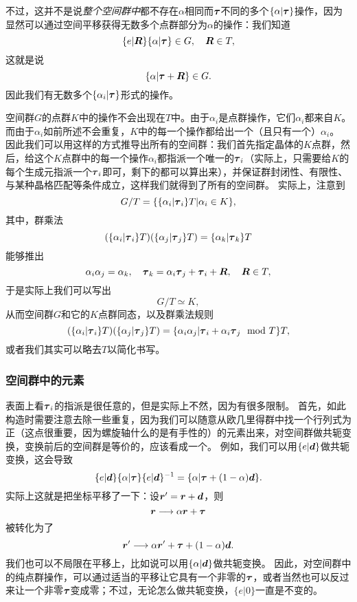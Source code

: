 不过，这并不是说\emph{整个空间群中}都不存在$\alpha$相同而$\vb*{\tau}$不同的多个$\{ \alpha | \vb*{\tau} \}$操作，因为显然可以通过空间平移获得无数多个点群部分为$\alpha$的操作：我们知道
\[
    \{e | \vb*{R}\} \{\alpha | \vb*{\tau}\} \in G, \quad \vb*{R} \in T,
\]
这就是说
\[
    \{\alpha | \vb*{\tau} + \vb*{R} \} \in G.
\]
因此我们有无数多个$\{ \alpha_i | \vb*{\tau} \}$形式的操作。

空间群$G$的点群$K$中的操作不会出现在$T$中。由于$\alpha_i$是点群操作，它们$\alpha_i$都来自$K$。而由于$\alpha_i$如前所述不会重复，$K$中的每一个操作都给出一个（且只有一个）$\alpha_i$。
因此我们可以用这样的方式推导出所有的空间群：我们首先指定晶体的$K$点群，然后，给这个$K$点群中的每一个操作$\alpha_i$都指派一个唯一的$\vb*{\tau}_i$（实际上，只需要给$K$的每个生成元指派一个$\vb*{\tau}_i$即可，剩下的都可以算出来），并保证群封闭性、有限性、与某种晶格匹配等条件成立，这样我们就得到了所有的空间群。
实际上，注意到
\[
    G / T = \{ \{\alpha_i | \vb*{\tau}_i \} T | \alpha_i \in K \},
\]
其中，群乘法
\[
    (\{\alpha_i | \vb*{\tau}_i \} T) (\{\alpha_j | \vb*{\tau}_j \} T) = \{\alpha_k | \vb*{\tau}_k \} T
\]
能够推出
\[
    \alpha_i \alpha_j = \alpha_k, \quad \vb*{\tau}_k = \alpha_i \vb*{\tau}_j + \vb*{\tau}_i + \vb*{R}, \quad \vb*{R} \in T,
\] 
于是实际上我们可以写出
\begin{equation}
    G / T \simeq K,
\end{equation}
从而空间群$G$和它的$K$点群同态，以及群乘法规则
\begin{equation}
    (\{\alpha_i | \vb*{\tau}_i \} T) (\{\alpha_j | \vb*{\tau}_j \} T) = \{\alpha_i \alpha_j | \vb*{\tau}_i + \alpha_i \vb*{\tau}_j \mod{T} \} T,
\end{equation}
或者我们其实可以略去$T$以简化书写。

\subsubsection{空间群中的元素} 

表面上看$\vb*{\tau}_i$的指派是很任意的，但是实际上不然，因为有很多限制。
首先，如此构造时需要注意去除一些重复，因为我们可以随意从欧几里得群中找一个行列式为正（这点很重要，因为螺旋轴什么的是有手性的）的元素出来，对空间群做共轭变换，变换前后的空间群是等价的，应该看成一个。
例如，我们可以用$\{e | \vb*{d}\}$做共轭变换，这会导致
\[
    \{e | \vb*{d}\} \{ \alpha | \vb*{\tau} \} \{ e | \vb*{d} \}^{-1} = \{ \alpha | \vb*{\tau} + (1 - \alpha) \vb*{d} \}.
\]
实际上这就是把坐标平移了一下：设$\vb*{r}' = \vb*{r} + \vb*{d}$，则
\[
    \vb*{r} \longrightarrow \alpha \vb*{r} + \vb*{\tau}
\]
被转化为了
\begin{equation}
    \vb*{r}' \longrightarrow \alpha \vb*{r}' + \vb*{\tau} + (1 - \alpha) \vb*{d}.
    \label{eq:conju-alpha}
\end{equation}
我们也可以不局限在平移上，比如说可以用$\{\alpha | \vb*{d}\}$做共轭变换。
因此，对空间群中的纯点群操作，可以通过适当的平移让它具有一个非零的$\vb*{\tau}$，或者当然也可以反过来让一个非零$\vb*{\tau}$变成零；不过，无论怎么做共轭变换，$\{e | 0\}$一直是不变的。

